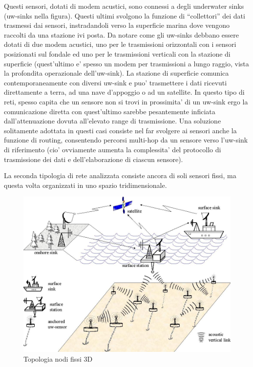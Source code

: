 Questi sensori, dotati di modem acustici, sono connessi a degli underwater sinks (uw-sinks nella figura). Questi ultimi svolgono la funzione di ``collettori'' dei dati trasmessi dai sensori, instradandoli verso la superficie marina dove vengono raccolti da una stazione ivi posta. Da notare come gli uw-sinks debbano essere dotati di due modem acustici, uno per le trasmissioni orizzontali con i sensori posizionati sul fondale ed uno per le trasmissioni verticali con la stazione di superficie (quest'ultimo e' spesso un modem per trasmissioni a lungo raggio, vista la profondita operazionale dell'uw-sink). La stazione di superficie comunica contemporaneamente con diversi uw-sink e puo' trasmettere i dati ricevuti direttamente a terra, ad una nave d'appoggio o ad un satellite.
In questo tipo di reti, spesso capita che un sensore non si trovi in prossimita' di un uw-sink ergo la comunicazione diretta con quest'ultimo sarebbe pesantemente inficiata dall'attenuazione dovuta all'elevato range di trasmissione. Una soluzione solitamente adottata in questi casi consiste nel far svolgere ai sensori anche la funzione di routing, consentendo percorsi multi-hop da un sensore verso l'uw-sink di riferimento (cio' ovviamente aumenta la complessita' del protocollo di trasmissione dei dati e dell'elaborazione di ciascun sensore).

La seconda tipologia di rete analizzata consiste ancora di soli sensori fissi, ma questa volta organizzati in uno spazio tridimensionale.

\begin{figure}[H]
    \centering
	\includegraphics[scale=0.3]{3D_arch.jpg}
	\caption{ Topologia nodi fissi 3D}
	\label{fig:}
\end{figure}

